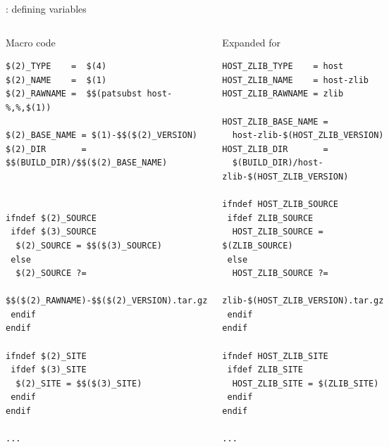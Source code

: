 \begin{frame}[fragile]{: defining variables}

\begin{columns}

\begin{block}{Macro code}
\begin{verbatim}
$(2)_TYPE    =  $(4)
$(2)_NAME    =  $(1)
$(2)_RAWNAME =  $$(patsubst host-%,%,$(1))

$(2)_BASE_NAME = $(1)-$$($(2)_VERSION)
$(2)_DIR       = $$(BUILD_DIR)/$$($(2)_BASE_NAME)



ifndef $(2)_SOURCE
 ifdef $(3)_SOURCE
  $(2)_SOURCE = $$($(3)_SOURCE)
 else
  $(2)_SOURCE ?=
    $$($(2)_RAWNAME)-$$($(2)_VERSION).tar.gz
 endif
endif

ifndef $(2)_SITE
 ifdef $(3)_SITE
  $(2)_SITE = $$($(3)_SITE)
 endif
endif

...
\end{verbatim}
\end{block}

\begin{block}{Expanded for }
\begin{verbatim}
HOST_ZLIB_TYPE    = host
HOST_ZLIB_NAME    = host-zlib
HOST_ZLIB_RAWNAME = zlib

HOST_ZLIB_BASE_NAME =
  host-zlib-$(HOST_ZLIB_VERSION)
HOST_ZLIB_DIR       =
  $(BUILD_DIR)/host-zlib-$(HOST_ZLIB_VERSION)

ifndef HOST_ZLIB_SOURCE
 ifdef ZLIB_SOURCE
  HOST_ZLIB_SOURCE = $(ZLIB_SOURCE)
 else
  HOST_ZLIB_SOURCE ?=
   zlib-$(HOST_ZLIB_VERSION).tar.gz
 endif
endif

ifndef HOST_ZLIB_SITE
 ifdef ZLIB_SITE
  HOST_ZLIB_SITE = $(ZLIB_SITE)
 endif
endif

...
\end{verbatim}
\end{block}

\end{columns}

\end{frame}

